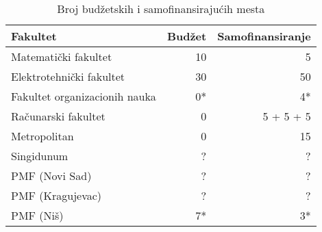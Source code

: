 \documentclass[a4paper]{report}
\begin{document}
\begin{itemize}
\begin{table}[h!]
\begin{center}
\caption{Broj budžetskih i samofinansirajućih mesta}
\begin{tabular}{|l|r|r|} \hline
Fakultet& Budžet& Samofinansiranje\\ \hline
Matematički fakultet& 10& 5\\ \hline
Elektrotehnički fakultet&30&50\\ \hline
Fakultet organizacionih nauka& 0*& 4*\\ \hline
Računarski fakultet& 0& 5 + 5 + 5\\ \hline
Metropolitan& 0& 15\\ \hline
Singidunum& ?& ?\\ \hline
PMF (Novi Sad)& ?& ?\\ \hline
PMF (Kragujevac)& ?& ?\\ \hline
PMF (Niš)& 7*& 3*\\ \hline
\end{tabular}
\label{tab:tabela-budzet-samofinans}
\end{center}
\end{table}


\end{itemize}
\end{document}
